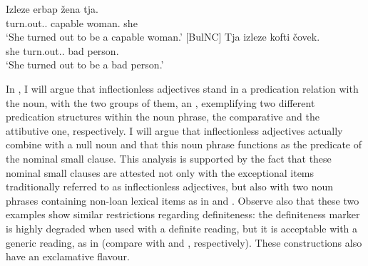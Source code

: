 \documentclass[output=paper]{langscibook}
\begin{document}
\ea \label{ge-ex-secpred0}
\ea \label{ge-ex-secpred1}
\gll Izleze erbap \v{z}ena tja.\\
turn.out.\Pst{}.\Tsg{} capable woman.\F{} she\\
\glt `She turned out to be a capable woman.' \hfill [BulNC]
\ex \label{ge-ex-secpred2}
\gll Tja izleze kofti \v{c}ovek.\\
she turn.out.\Pst{}.\Tsg{} bad person.\M{} \\
\glt `She turned out to be a bad person.' 
\z 
\z



\noindent In , I will argue that inflectionless adjectives stand in a predication relation with the noun, with the two groups of them,  an , exemplifying two different predication structures within the noun phrase, the comparative and the attibutive one, respectively. I will argue that inflectionless adjectives actually combine with a null noun and that this noun phrase functions as the predicate of the nominal small clause. This analysis is supported by the fact that these nominal small clauses are attested not only with the exceptional items traditionally referred to as inflectionless adjectives, but also with two noun phrases containing non-loan lexical items as in  and . Observe also that these two examples show similar restrictions regarding definiteness: the definiteness marker is highly degraded when used with a definite reading, but it is acceptable with a generic reading, as in  (compare with  and , respectively). These constructions also have an exclamative flavour. 

\z 
\end{document}
